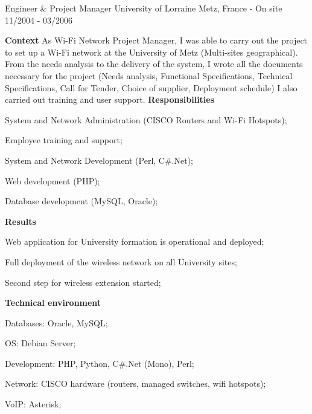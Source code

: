 \begin{cventries}
  \cventry
    {Engineer \& Project Manager} %
    {University of Lorraine} %
    {Metz, France - On site} %
    {11/2004 - 03/2006} %
    {
      \textbf{Context}
      \newline
      As Wi-Fi Network Project Manager, I was able to carry out the project to set up a 
      Wi-Fi network at the University of Metz (Multi-sites geographical). 
      \newline
      From the needs analysis to the delivery of the system, I wrote all the documents 
      necessary for the project (Needs analysis, Functional Specifications, Technical 
      Specifications, Call for Tender, Choice of supplier, Deployment schedule) 
      \newline
      I also carried out training and user support.
      \newline \vspace{2pt}
      \textbf{Responsibilities}
      \newline \vspace{12pt}
      \begin{cvitems}
        \item {System and Network Administration (CISCO Routers and Wi-Fi Hotspots);}
        \item {Employee training and support;}
        \item {System and Network Development (Perl, C\#.Net);}
        \item {Web development (PHP);}
        \item {Database development (MySQL, Oracle);}
      \end{cvitems}
      \textbf{Results}
      \newline \vspace{12pt}
      \begin{cvitems}
        \item {Web application for University formation is operational and deployed;}
        \item {Full deployment of the wireless network on all University sites;}
        \item {Second step for wireless extension started;}
      \end{cvitems}
      \textbf{Technical environment}
      \newline \vspace{12pt}
      \begin{cvitems}
        \item {Databases: Oracle, MySQL;}
        \item {OS: Debian Server;}
        \item {Development: PHP, Python, C\#.Net (Mono), Perl;}
        \item {Network: CISCO hardware (routers, managed switches, wifi hotspots);}
        \item {VoIP: Asterisk;}
      \end{cvitems}
    }






  \end{cventries}
